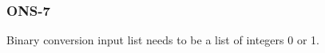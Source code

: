 \subsubsection{ONS-7}\label{sec:error_code_ons_7}

Binary conversion input list needs to be a list of integers 0 or 1.


